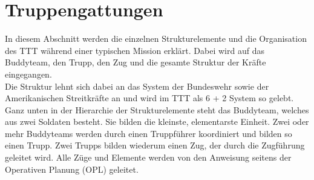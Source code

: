 \section{Truppengattungen}
	In diesem Abschnitt werden die einzelnen Strukturelemente und die Organisation des \ac{TTT} während einer typischen Mission erklärt. Dabei wird auf das Buddyteam, den Trupp, den Zug und die gesamte Struktur der Kräfte eingegangen.\\
	Die Struktur lehnt sich dabei an das System der Bundeswehr sowie der Amerikanischen Streitkräfte an und wird im \ac{TTT} als 6 + 2 System so gelebt.\\
	Ganz unten in der Hierarchie der Strukturelemente steht das Buddyteam, welches aus zwei Soldaten besteht. Sie bilden die kleinste, elementarste Einheit. Zwei oder mehr Buddyteams werden durch einen Truppführer koordiniert und bilden so einen Trupp. Zwei Trupps bilden wiederum einen Zug, der durch die Zugführung geleitet wird. Alle Züge und Elemente werden von den Anweisung seitens der Operativen Planung (\ac{OPL}) geleitet.  










